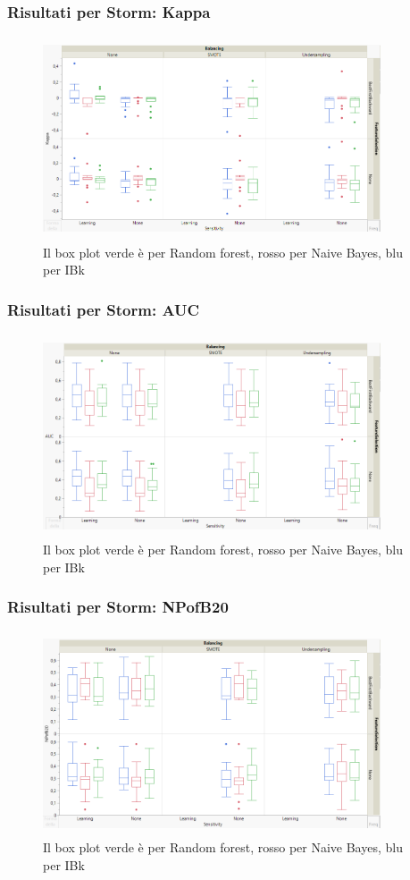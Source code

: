 \documentclass{beamer}
\begin{document}
\begin{frame}
	\frametitle{Risultati per Storm: Kappa}
	
	\centering
	\begin{figure}
	\includegraphics[width=10cm, height=6cm]{storm-kappa}
	\caption{Il box plot verde è per Random forest, rosso per Naive Bayes, blu per IBk}
	\end{figure}
\end{frame}

\begin{frame}
	\frametitle{Risultati per Storm: AUC}
	
	\centering
	\begin{figure}
	\includegraphics[width=10cm, height=6cm]{storm-auc}
	\caption{Il box plot verde è per Random forest, rosso per Naive Bayes, blu per IBk}
	\end{figure}
\end{frame}

\begin{frame}
	\frametitle{Risultati per Storm: NPofB20}
	
	\centering
	\begin{figure}
	\includegraphics[width=10cm, height=6cm]{storm-npofb20}
	\caption{Il box plot verde è per Random forest, rosso per Naive Bayes, blu per IBk}
	\end{figure}
\end{frame}
\end{document}
